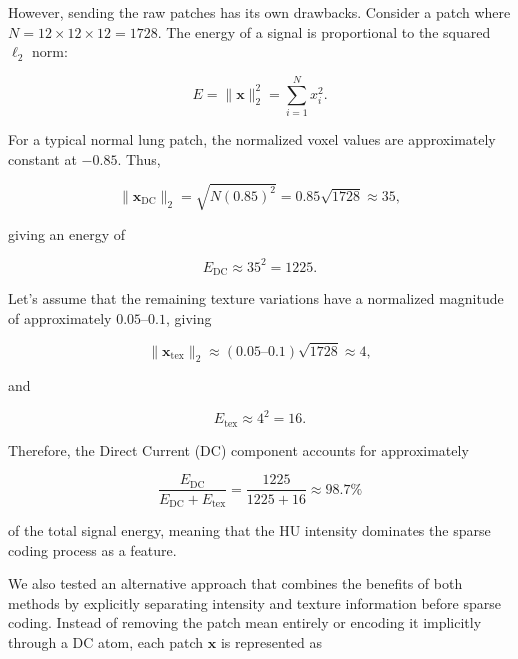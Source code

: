 However, sending the raw patches has its own drawbacks. Consider a patch where
$N=12\times12\times12=1728$. The energy of a signal is proportional to the squared $\ell_2$ norm:

\begin{equation}[Patch Signal Energy]
E = \|\mathbf{x}\|_2^2 = \sum_{i=1}^{N} x_i^2.
\end{equation}

For a typical normal lung patch, the normalized voxel values are approximately constant at $-0.85$. Thus,

\begin{equation}[DC Component Magnitude]
\|\mathbf{x}_{\mathrm{DC}}\|_2
= \sqrt{N(0.85)^2}
= 0.85\sqrt{1728}
\approx 35,
\end{equation}

\noindent giving an energy of

\begin{equation}[DC Component Energy]
E_{\mathrm{DC}} \approx 35^2 = 1225.
\end{equation}

Let's assume that the remaining texture variations have a normalized magnitude of approximately $0.05$--$0.1$, giving

\begin{equation}[Texture Component Magnitude]
\|\mathbf{x}_{\mathrm{tex}}\|_2
\approx (0.05\text{--}0.1)\sqrt{1728}
\approx 4,
\end{equation}

\noindent and

\begin{equation}[Texture Component Energy]
E_{\mathrm{tex}} \approx 4^2 = 16.
\end{equation}

Therefore, the Direct Current (DC) component accounts for approximately

\begin{equation}[DC Energy Fraction]
\frac{E_{\mathrm{DC}}}{E_{\mathrm{DC}} + E_{\mathrm{tex}}}
=
\frac{1225}{1225+16}
\approx 98.7\%
\end{equation}

\noindent of the total signal energy, meaning that the HU intensity dominates the sparse coding process as a feature.

We also tested an alternative approach that combines the benefits of both methods by explicitly separating intensity and texture
information before sparse coding. Instead of removing the patch mean entirely or encoding it implicitly through a DC atom, each
patch $\mathbf{x}$ is represented as

